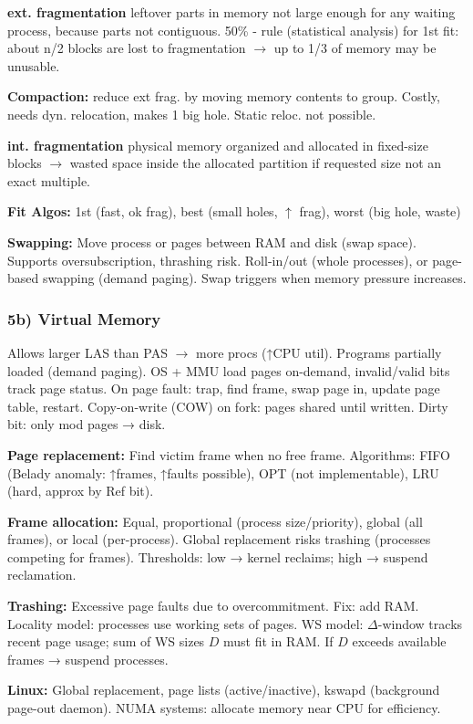 \textbf{ext. fragmentation}
leftover parts in memory not large enough for any waiting process, because parts not contiguous.
50\% - rule (statistical analysis) for 1st fit: about n/2 blocks are lost to fragmentation $\to$ up to 1/3 of memory may be unusable.

\textbf{Compaction:} reduce ext frag. by moving memory contents to group. Costly, needs dyn. relocation, makes 1 big hole. Static reloc. not possible.

\textbf{int. fragmentation}
physical memory organized and allocated in fixed-size blocks $\to$ wasted space inside the allocated partition if requested size not an exact multiple.

\textbf{Fit Algos:} 1st (fast, ok frag), best (small holes, $\uparrow$ frag), worst (big hole, waste)

\textbf{Swapping:} Move process or pages between RAM and disk (swap space). Supports oversubscription, thrashing risk. Roll-in/out (whole processes), or page-based swapping (demand paging). Swap triggers when memory pressure increases.

\subsubsection*{5b) Virtual Memory}
Allows larger LAS than PAS $\to$ more procs (↑CPU util). Programs partially loaded (demand paging). OS + MMU load pages on-demand, invalid/valid bits track page status. On page fault: trap, find frame, swap page in, update page table, restart. Copy-on-write (COW) on fork: pages shared until written.
Dirty bit: only mod pages → disk.

\textbf{Page replacement:} Find victim frame when no free frame. Algorithms: FIFO (Belady anomaly: ↑frames, ↑faults possible), OPT (not implementable), LRU (hard, approx by Ref bit).

\textbf{Frame allocation:} Equal, proportional (process size/priority), global (all frames), or local (per-process). Global replacement risks trashing (processes competing for frames). Thresholds: low → kernel reclaims; high → suspend reclamation.

\textbf{Trashing:} Excessive page faults due to overcommitment. Fix: add RAM. Locality model: processes use working sets of pages. WS model: \(\Delta\)-window tracks recent page usage; sum of WS sizes \(D\) must fit in RAM. If \(D\) exceeds available frames → suspend processes.

\textbf{Linux:} Global replacement, page lists (active/inactive), kswapd (background page-out daemon). NUMA systems: allocate memory near CPU for efficiency.
